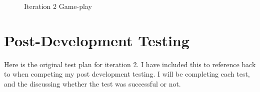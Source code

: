 \documentclass[12pt]{report}
\begin{document}
 
 \begin{figure}[H]
    \caption{Iteration 2 Game-play}
\end{figure}
 
\pagebreak
 
\section{Post-Development Testing}
Here is the original test plan for iteration 2. I have included this to reference back to when competing my post development testing. I will be completing each test, and the discussing whether the test was successful or not.
\end{document}
